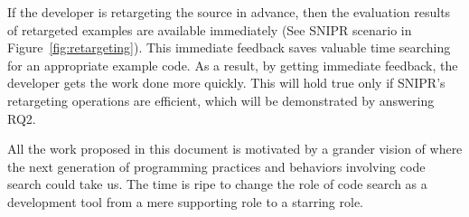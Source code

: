 \begin{itemize}
	If the developer is retargeting the source in advance, then the evaluation results of 
	retargeted examples are available immediately (See \uppercase{SnipR} scenario in 
	Figure~\ref{fig:retargeting}). This immediate feedback saves valuable time searching for an 
	appropriate example code. As a result, by getting immediate feedback, the developer gets the 
	work done more quickly. This will hold true only if \uppercase{SnipR}'s retargeting operations 
	are efficient, which will be demonstrated by answering RQ2.
	
		
\end{itemize}

All the work proposed in this document is motivated by a grander vision of where the next generation of programming practices and behaviors involving code search could take us. The time is ripe to change the role of code search as a development tool from a mere supporting role to a starring role.